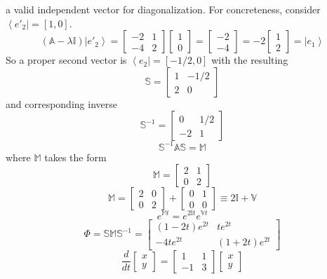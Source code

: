 \documentclass[10pt]{article}
\begin{document}
a valid independent vector for diagonalization.  For concreteness, consider $\left< e'_2 \right| = [1,0]$.
\[
\left( {\mathbb A} - \lambda {\mathbb I} \right) \left| e'_2 \right> 
    =    \left[ \begin{array}{cc} -2 & 1\\ -4 & 2\end{array}\right] \left[\begin{array}{c}1\\0\end{array} \right]
    =    \left[\begin{array}{c}-2\\-4\end{array}\right]
    = -2 \left[\begin{array}{c}1\\2\end{array}\right]
    = \left| e_1 \right>
\]
So a proper second vector is $\left<e_2\right| = \left[-1/2,0\right]$ with the resulting 
\[
  \mathbb{S}      = \left[ \begin{array}{cc}1 & -1/2 \\ 2 & 0 \end{array} \right]
\]
and corresponding inverse
\[
  \mathbb{S}^{-1} = \left[ \begin{array}{cc}0 & 1/2 \\ -2 & 1 \end{array} \right]
\]
\[
  {\mathbb S}^{-1} {\mathbb A} {\mathbb S} = {\mathbb M}
\]
where ${\mathbb M}$ takes the form
\[
  \mathbb{M} = \left[ \begin{array}{cc} 2 & 1 \\ 0 & 2 \end{array} \right]
\]
\[
  \mathbb{M}  =       
         \left[ \begin{array}{cc} 2 & 0 \\ 0 & 2 \end{array} \right] 
       + \left[ \begin{array}{cc} 0 & 1 \\ 0 & 0 \end{array} \right]
     \equiv   
         2 \mathbb{I} + \mathbb{V}   
\]
\[
  e^{\mathbb{M}t} = e^{2\mathbb{I}t} e^{\mathbb{V}t} 
\]
\[
  \Phi = \mathbb{S} \mathbb{M} \mathbb{S}^{-1} 
       = \left[ \begin{array}{cc} (1-2t) e^{2t} & t e^{2t} \\ -4 t e^{2 t} & (1+2t) e^{2t} \end{array} \right]
\]
\[
   \frac{d}{dt} \left[ \begin{array}{c}x \\ y \end{array} \right]
     = \left[ \begin{array}{cc}
                             1  & 1 \\
                             -1 & 3 
                       \end{array} \right]
      \left[ \begin{array}{c}x \\ y \end{array} \right]
\]
\end{document}
